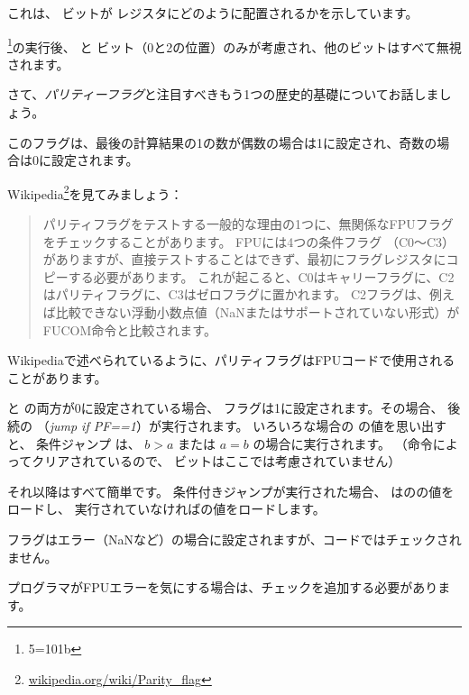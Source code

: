 

これは、 \CThreeBits ビットが \AH レジスタにどのように配置されるかを示しています。



\footnote{5=101b}の実行後、
\Czero と \Ctwo ビット（0と2の位置）のみが考慮され、他のビットはすべて無視されます。

\label{parity_flag}

さて、\emph{パリティーフラグ}と注目すべきもう1つの歴史的基礎についてお話しましょう。

このフラグは、最後の計算結果の1の数が偶数の場合は1に設定され、奇数の場合は0に設定されます。

Wikipedia\footnote{\href{http://go.yurichev.com/17131}{wikipedia.org/wiki/Parity\_flag}}を見てみましょう：

\begin{framed}
\begin{quotation}
パリティフラグをテストする一般的な理由の1つに、無関係なFPUフラグをチェックすることがあります。 FPUには4つの条件フラグ
（C0～C3）がありますが、直接テストすることはできず、最初にフラグレジスタにコピーする必要があります。 
これが起こると、C0はキャリーフラグに、C2はパリティフラグに、C3はゼロフラグに置かれます。 
C2フラグは、例えば比較できない浮動小数点値（NaNまたはサポートされていない形式）がFUCOM命令と比較されます。
\end{quotation}
\end{framed}

Wikipediaで述べられているように、パリティフラグはFPUコードで使用されることがあります。


\Czero と \Ctwo の両方が0に設定されている場合、 \PF フラグは1に設定されます。その場合、
後続の \JP （\emph{jump if PF==1}）が実行されます。 
いろいろな場合の \CThreeBits の値を思い出すと、
条件ジャンプ \JP は、 $b>a$ または $a=b$ の場合に実行されます。
（命令によってクリアされているので、 \Cthree ビットはここでは考慮されていません）

それ以降はすべて簡単です。 
条件付きジャンプが実行された場合、
\FLD はのの値をロードし、
実行されていなければの値をロードします。


\Ctwo フラグはエラー（\gls{NaN}など）の場合に設定されますが、コードではチェックされません。

プログラマがFPUエラーを気にする場合は、チェックを追加する必要があります。


